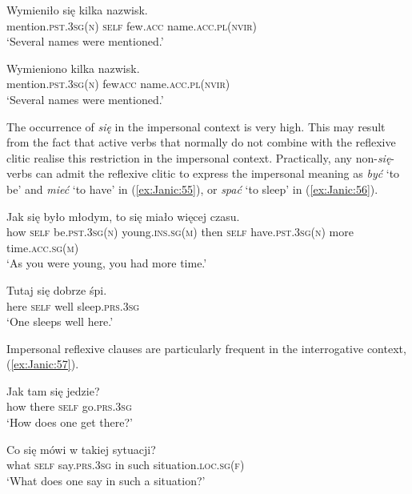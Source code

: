 \documentclass[output=paper]{langscibook}
\begin{document}
\ea \label{ex:Janic:54}
\ea \label{ex:Janic:54a}
\gll Wymieniło			 się		 kilka	 nazwisk.\\
		mention.\textsc{pst.3sg(n)} \textsc{self}	few.\textsc{acc}	name.\textsc{acc.pl(nvir)}\\	
\glt ‘Several names were mentioned.’

\ex \label{ex:Janic:54b}
\gll Wymieniono	 	kilka 	nazwisk.\\
		mention.\textsc{pst.3sg(n)}		few\textsc{acc} name.\textsc{acc.pl(nvir)}\\
\glt ‘Several names were mentioned.’	\citep[316]{Swan2002}
\z 
\z 
		
The occurrence of \textit{się} in the impersonal context is very high. This may result from the fact that active verbs that normally do not combine with the reflexive clitic realise this restriction in the impersonal context. Practically, any non-\textit{się}-verbs can admit the reflexive clitic to express the impersonal meaning as \textit{być} ‘to be’ and \textit{mieć} ‘to have’ in (\ref{ex:Janic:55}), or \textit{spać} ‘to sleep’ in (\ref{ex:Janic:56}). 

\ea \label{ex:Janic:55}
\gll Jak	się	 było		 młodym,	 to	 się	 miało	 więcej	czasu.\\
	 how	\textsc{self}	be.\textsc{pst.3sg(n)}	young.\textsc{ins.sg(m)}	then	\textsc{self}	have.\textsc{pst.3sg(n)}	more	time.\textsc{acc.sg(m)}\\
\glt ‘As you were young, you had more time.’
\z 

\ea \label{ex:Janic:56}
\gll Tutaj	się	 dobrze	śpi.\\
	 here	\textsc{self}	well	sleep.\textsc{prs.3sg}\\
\glt ‘One sleeps well here.’							 \citep[60]{Bielec1998}
\z 
	
Impersonal reflexive clauses are particularly frequent in the interrogative context, (\ref{ex:Janic:57}). 

\ea \label{ex:Janic:57}
\ea \label{ex:Janic:57a}

\gll Jak	tam	 się			 jedzie?\\
		how	there	\textsc{self}	go.\textsc{prs.3sg}	\\
\glt ‘How does one get there?’

\ex \label{ex:Janic:57b}
\gll Co	 się	 mówi		 w	takiej	 sytuacji?\\
		what	\textsc{self}	say.\textsc{prs.3sg}	in	such	 situation.\textsc{loc.sg(f)}\\
\glt ‘What does one say in such a situation?’ 				 \citep[320]{Swan2002}
\z 
\z 
	
\end{document}
